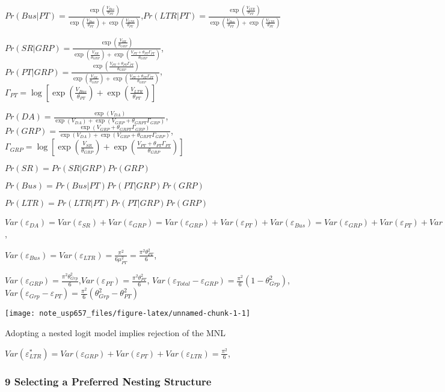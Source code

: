 \documentclass[
]{article}
\begin{document}
\(Pr(Bus|PT)=\frac{\exp{(\frac{V_{Bus}}{\theta_{PT}})}}{\exp{(\frac{V_{Bus}}{\theta_{PT}})}+\exp{(\frac{V_{LTR}}{\theta_{PT}})}}\),\(Pr(LTR|PT)=\frac{\exp{(\frac{V_{LTR}}{\theta_{PT}})}}{\exp{(\frac{V_{Bus}}{\theta_{PT}})}+\exp{(\frac{V_{LTR}}{\theta_{PT}})}}\)

\(Pr(SR|GRP)=\frac{\exp{(\frac{V_{SR}}{\theta_{GRP}})}}{\exp{(\frac{V_{SR}}{\theta_{GRP}})}+\exp{(\frac{V_{PT}+\theta_{PT}\Gamma_{PT}}{\theta_{GRP}})}}\),
\(Pr(PT|GRP)=\frac{\exp{(\frac{V_{PT}+\theta_{PT}\Gamma_{PT}}{\theta_{GRP}})}}{\exp{(\frac{V_{SR}}{\theta_{GRP}})}+\exp{(\frac{V_{PT}+\theta_{PT}\Gamma_{PT}}{\theta_{GRP}})}}\),
\(\Gamma_{PT}=\log[\exp{(\frac{V_{Bus}}{\theta_{PT}})}+\exp{(\frac{V_{LTR}}{\theta_{PT}})}]\)

\(Pr(DA)=\frac{\exp{(V_{DA})}}{\exp{(V_{DA})}+\exp{(V_{GRP}+\theta_{GRPT}\Gamma_{GRP})}}\),
\(Pr(GRP)=\frac{\exp{(V_{GRP}+\theta_{GRPT}\Gamma_{GRP})}}{\exp{(V_{DA})}+\exp{(V_{GRP}+\theta_{GRPT}\Gamma_{GRP})}}\),
\(\Gamma_{GRP}=\log[\exp{(\frac{V_{SR}}{\theta_{GRP}})}+\exp{(\frac{V_{PT}+\theta_{PT}\Gamma_{PT}}{\theta_{GRP}})}]\)

\(Pr(SR)=Pr(SR|GRP)Pr(GRP)\)

\(Pr(Bus)=Pr(Bus|PT)Pr(PT|GRP)Pr(GRP)\)

\(Pr(LTR)=Pr(LTR|PT)Pr(PT|GRP)Pr(GRP)\)

\(Var(\varepsilon_{DA})=Var(\varepsilon_{SR})+Var(\varepsilon_{GRP})=Var(\varepsilon_{GRP})+Var(\varepsilon_{PT})+Var(\varepsilon_{Bus})=Var(\varepsilon_{GRP})+Var(\varepsilon_{PT})+Var(\varepsilon_{LTR})=\frac{\pi^2}{6}\),

\(Var(\varepsilon_{Bus})=Var(\varepsilon_{LTR})=\frac{\pi^2}{6\mu_{PT}^2}=\frac{\pi^2\theta^2_{PT}}{6}\),

\(Var(\varepsilon_{GRP})=\frac{\pi^2\theta^2_{Grp}}{6}\),\(Var(\varepsilon_{PT})=\frac{\pi^2\theta^2_{PT}}{6}\),
\(Var(\varepsilon_{Total}-\varepsilon_{GRP})=\frac{\pi^2}{6}(1-\theta^2_{Grp})\),\(Var(\varepsilon_{Grp}-\varepsilon_{PT})=\frac{\pi^2}{6}(\theta^2_{Grp}-\theta^2_{PT})\)

\texttt{[image: note\_usp657\_files/figure-latex/unnamed-chunk-1-1]}

Adopting a nested logit model implies rejection of the MNL

\(Var(\varepsilon_{LTR}^*)=Var(\varepsilon_{GRP})+Var(\varepsilon_{PT})+Var(\varepsilon_{LTR})=\frac{\pi^2}{6}\),

\hypertarget{selecting-a-preferred-nesting-structure}{%
\subsubsection{9 Selecting a Preferred Nesting
Structure}\label{selecting-a-preferred-nesting-structure}}
\end{document}
